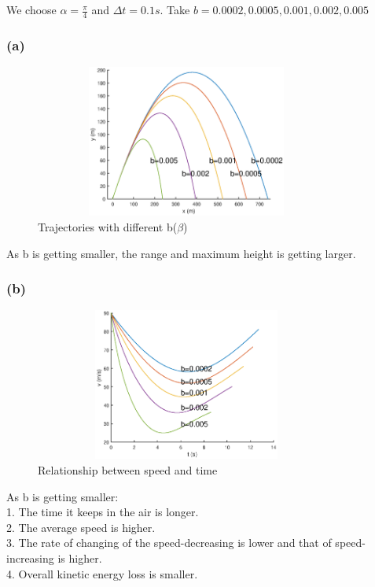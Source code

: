 \documentclass{article}
\begin{document}
\subsection{}
We choose $\alpha=\frac{\pi}{4}$ and $\Delta t=0.1s$. Take $b=0.0002,0.0005,0.001,0.002,0.005$
\subsubsection*{(a)}
\begin{figure}[!htb] 
\centering 
\includegraphics[height=5cm,width=10cm]{linear_figure8_1.eps}
\caption{Trajectories with different b($\beta$)}
\end{figure}
As b is getting smaller, the range and maximum height is getting larger.
\subsubsection*{(b)}
\begin{figure}[!htb] 
\centering 
\includegraphics[height=5cm,width=10cm]{linear_figure8_2.eps}
\caption{Relationship between speed and time}
\end{figure}
\noindent As b is getting smaller:\\
1. The time it keeps in the air is longer.\\
2. The average speed is higher.\\
3. The rate of changing of the speed-decreasing is lower and that of speed-increasing is higher.\\
4. Overall kinetic energy loss is smaller.
\newpage
\end{document}
